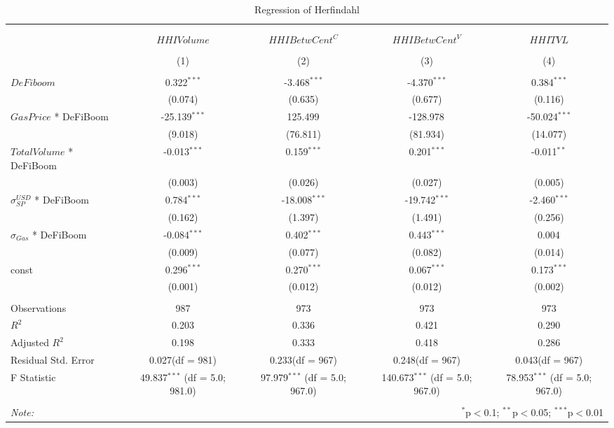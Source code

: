 \begin{table}[!htbp] \centering
  \caption{Regression of Herfindahl}
\begin{tabular}{@{\extracolsep{5pt}}lcccc}
\\[-1.8ex]\hline
\hline \\[-1.8ex]
\\[-1.8ex] & \multicolumn{1}{c}{${	 HHIVolume}$} & \multicolumn{1}{c}{${	 HHIBetwCent}^C$} & \multicolumn{1}{c}{${	 HHIBetwCent}^V$} & \multicolumn{1}{c}{${	 HHITVL}$}  \\
\\[-1.8ex] & (1) & (2) & (3) & (4) \\
\hline \\[-1.8ex]
 ${	 DeFiboom}$ & 0.322$^{***}$ & -3.468$^{***}$ & -4.370$^{***}$ & 0.384$^{***}$ \\
  & (0.074) & (0.635) & (0.677) & (0.116) \\
 ${	 GasPrice}$ * DeFiBoom & -25.139$^{***}$ & 125.499$^{}$ & -128.978$^{}$ & -50.024$^{***}$ \\
  & (9.018) & (76.811) & (81.934) & (14.077) \\
 ${	 TotalVolume}$ * DeFiBoom & -0.013$^{***}$ & 0.159$^{***}$ & 0.201$^{***}$ & -0.011$^{**}$ \\
  & (0.003) & (0.026) & (0.027) & (0.005) \\
 ${	 \sigma}^{USD}_{SP}$ * DeFiBoom & 0.784$^{***}$ & -18.008$^{***}$ & -19.742$^{***}$ & -2.460$^{***}$ \\
  & (0.162) & (1.397) & (1.491) & (0.256) \\
 ${	 \sigma}_{Gas}$ * DeFiBoom & -0.084$^{***}$ & 0.402$^{***}$ & 0.443$^{***}$ & 0.004$^{}$ \\
  & (0.009) & (0.077) & (0.082) & (0.014) \\
 const & 0.296$^{***}$ & 0.270$^{***}$ & 0.067$^{***}$ & 0.173$^{***}$ \\
  & (0.001) & (0.012) & (0.012) & (0.002) \\
\hline \\[-1.8ex]
 Observations & 987 & 973 & 973 & 973 \\
 $R^2$ & 0.203 & 0.336 & 0.421 & 0.290 \\
 Adjusted $R^2$ & 0.198 & 0.333 & 0.418 & 0.286 \\
 Residual Std. Error & 0.027(df = 981) & 0.233(df = 967) & 0.248(df = 967) & 0.043(df = 967)  \\
 F Statistic & 49.837$^{***}$ (df = 5.0; 981.0) & 97.979$^{***}$ (df = 5.0; 967.0) & 140.673$^{***}$ (df = 5.0; 967.0) & 78.953$^{***}$ (df = 5.0; 967.0) \\
\hline
\hline \\[-1.8ex]
\textit{Note:} & \multicolumn{4}{r}{$^{*}$p$<$0.1; $^{**}$p$<$0.05; $^{***}$p$<$0.01} \\
\end{tabular}
\end{table}